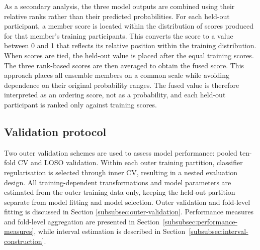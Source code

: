 As a secondary analysis, the three model outputs are combined using their relative ranks rather than their predicted probabilities. For each held-out participant, a member score is located within the distribution of scores produced for that member's training participants. This converts the score to a value between 0 and 1 that reflects its relative position within the training distribution. When scores are tied, the held-out value is placed after the equal training scores. The three rank-based scores are then averaged to obtain the fused score. This approach places all ensemble members on a common scale while avoiding dependence on their original probability ranges. The fused value is therefore interpreted as an ordering score, not as a probability, and each held-out participant is ranked only against training scores.


\subsection{Validation protocol}
\label{subsec:validation-protocol}

Two outer validation schemes are used to assess model performance: pooled ten-fold CV and LOSO validation. Within each outer training partition, classifier regularisation is selected through inner CV, resulting in a nested evaluation design. All training-dependent transformations and model parameters are estimated from the outer training data only, keeping the held-out partition separate from model fitting and model selection. Outer validation and fold-level fitting is discussed in Section \ref{subsubsec:outer-validation}. Performance measures and fold-level aggregation are presented in Section~\ref{subsubsec:performance-measures}, while interval estimation is described in Section~\ref{subsubsec:interval-construction}.

